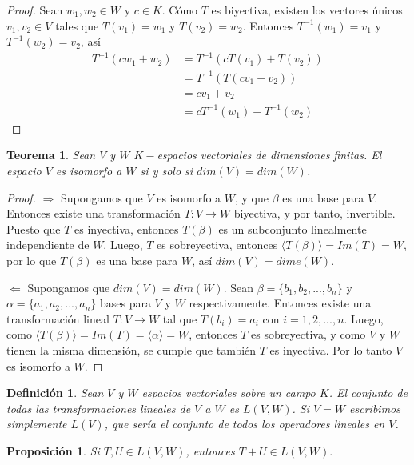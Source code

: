 \documentclass{book}
\newtheorem{theorem}{Teorema}
\newtheorem{proposition}{Proposición}
\newtheorem{definition}{Definición}
\begin{document}
\begin{proof}
Sean $w_1,w_2 \in W$ y $c\in K$. Cómo $T$ es biyectiva, existen los vectores únicos $v_1,v_2 \in V$ tales que $T(v_1)=w_1$ y $T(v_2)=w_2$. Entonces $T^{-1}(w_1)=v_1$ y $T^{-1}(w_2)=v_2$, así
\[
\begin{split}
T^{-1}(cw_1+w_2) &= T^{-1}(cT(v_1)+T(v_2)) \\
&= T^{-1}(T(cv_1+v_2)) \\
&= cv_1+v_2 \\
&= cT^{-1}(w_1)+T^{-1}(w_2)
\end{split}
\]
\end{proof}

\begin{theorem}
Sean $V$ y $W$ $K-$espacios vectoriales de dimensiones finitas. El espacio $V$ es isomorfo a $W$ si y solo si $dim(V)=dim(W)$.
\end{theorem}

\begin{proof}
$\Rightarrow$ Supongamos que $V$ es isomorfo a $W$, y que $\beta$ es una base para $V$. Entonces existe una transformación $T:V\rightarrow W$ biyectiva, y por tanto, invertible. Puesto que $T$ es inyectiva, entonces $T(\beta)$ es un subconjunto linealmente independiente de $W$. Luego, $T$ es sobreyectiva, entonces $\langle T(\beta)\rangle =Im(T)=W$, por lo que $T(\beta)$ es una base para $W$, así $dim(V)=dime(W)$.

$\Leftarrow$ Supongamos que $dim(V)=dim(W)$. Sean $\beta=\{b_1,b_2,...,b_n\}$ y  
$\alpha=\{a_1,a_2,...,a_n\}$ bases para $V$ y $W$ respectivamente. Entonces existe una transformación lineal $T:V\rightarrow W$ tal que $T(b_i)=a_i$ con $i=1,2,...,n$. Luego, como $\langle T(\beta)\rangle =Im(T)=\langle \alpha\rangle =W$, entonces $T$ es sobreyectiva, y como $V$ y $W$ tienen la misma dimensión, se cumple que también $T$ es inyectiva. Por lo tanto $V$ es isomorfo a $W$.
\end{proof}

\begin{definition}
Sean $V$ y $W$ espacios vectoriales sobre un campo $K$. El conjunto de todas las transformaciones lineales de $V$ a $W$ es $L(V,W)$. Si $V=W$ escribimos simplemente $L(V)$, que sería el conjunto de todos los operadores lineales en $V$.
\end{definition}

\begin{proposition}
Si $T,U \in L(V,W)$, entonces $T+U \in L(V,W).$
\end{proposition}
\end{document}

